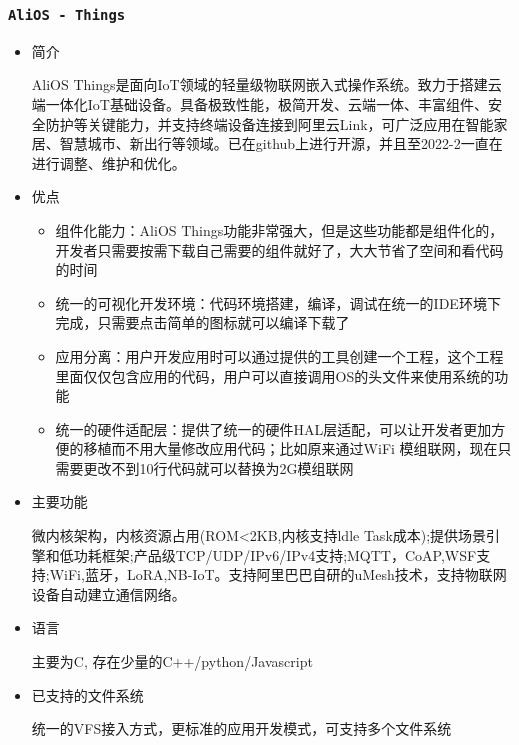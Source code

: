 \documentclass[UTF8,a4paper]{ctexart}
\begin{document}
\subsubsection{\texttt{AliOS - Things}}
\begin{itemize}
\item 简介

AliOS Things是面向IoT领域的轻量级物联网嵌入式操作系统。致力于搭建云端一体化IoT基础设备。具备极致性能，极简开发、云端一体、丰富组件、安全防护等关键能力，并支持终端设备连接到阿里云Link，可广泛应用在智能家居、智慧城市、新出行等领域。已在github上进行开源，并且至2022-2一直在进行调整、维护和优化。

\item 优点
\begin{itemize}
    \item 组件化能力：AliOS Things功能非常强大，但是这些功能都是组件化的，开发者只需要按需下载自己需要的组件就好了，大大节省了空间和看代码的时间
    \item 统一的可视化开发环境：代码环境搭建，编译，调试在统一的IDE环境下完成，只需要点击简单的图标就可以编译下载了
    \item 应用分离：用户开发应用时可以通过提供的工具创建一个工程，这个工程里面仅仅包含应用的代码，用户可以直接调用OS的头文件来使用系统的功能
    \item 统一的硬件适配层：提供了统一的硬件HAL层适配，可以让开发者更加方便的移植而不用大量修改应用代码；比如原来通过WiFi 模组联网，现在只需要更改不到10行代码就可以替换为2G模组联网
\end{itemize}
\item 主要功能

微内核架构，内核资源占用(ROM<2KB,内核支持ldle Task成本);提供场景引擎和低功耗框架;产品级TCP/UDP/IPv6/IPv4支持;MQTT，CoAP,WSF支持;WiFi,蓝牙，LoRA,NB-IoT。支持阿里巴巴自研的uMesh技术，支持物联网设备自动建立通信网络。
\item 语言

主要为C, 存在少量的C++/python/Javascript
\item 已支持的文件系统

统一的VFS接入方式，更标准的应用开发模式，可支持多个文件系统
\end{itemize}
\end{document}
